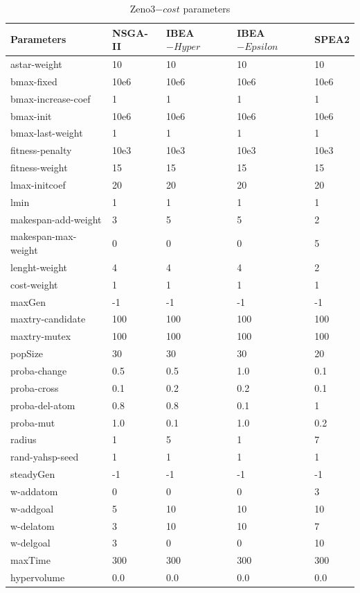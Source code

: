 \documentclass[a4paper,10pt]{article}
\begin{document}
\begin{table}[h]
\scriptsize
\begin{tabular}{|l|l|l|l|l|}

\hline
Parameters & NSGA-II & IBEA$-{Hyper}$ &IBEA$-{Epsilon}$ &    SPEA2\\
\hline
astar-weight		&	10	&	10	&	10	&	10		\\
bmax-fixed		&	10e6	&	10e6	&	10e6	&	10e6		\\
bmax-increase-coef		&	1	&	1	&	1	&	1		\\
bmax-init		&	10e6	&	10e6	&	10e6	&	10e6		\\
bmax-last-weight		&	1	&	1	&	1	&	1		\\
fitness-penalty		&	10e3	&	10e3	&	10e3	&	10e3		\\
fitness-weight		&	15	&	15	&	15	&	15		\\
lmax-initcoef		&	20	&	20	&	20	&	20		\\
lmin		&	1	&	1	&	1	&	1		\\
makespan-add-weight		&	3	&	5	&	5	&	2		\\
makespan-max-weight		&	0	&	0	&	0	&	5		\\
lenght-weight		&	4	&	4	&	4	&	2		\\
cost-weight		&	1	&	1	&	1	&	1		\\
maxGen		&	-1	&	-1	&	-1	&	-1		\\
maxtry-candidate		&	100	&	100	&	100	&	100		\\
maxtry-mutex		&	100	&	100	&	100	&	100		\\
popSize		&	30	&	30	&	30	&	20		\\
proba-change		&	0.5	&	0.5	&	1.0	&	0.1		\\
proba-cross		&	0.1	&	0.2	&	0.2	&	0.1		\\
proba-del-atom		&	0.8	&	0.8	&	0.1	&	1		\\
proba-mut		&	1.0	&	0.1	&	1.0	&	0.2		\\
radius		&	1	&	5	&	1	&	7		\\
rand-yahsp-seed		&	1	&	1	&	1	&	1		\\
steadyGen		&	-1	&	-1	&	-1	&	-1		\\
w-addatom		&	0	&	0	&	0	&	3		\\
w-addgoal		&	5	&	10	&	10	&	10		\\
w-delatom		&	3	&	10	&	10	&	7		\\
w-delgoal		&	3	&	0	&	0	&	10		\\
maxTime		&	300	&	300	&	300	&	300		\\
\hline
hypervolume		&	 0.0	&	 0.0	&	 0.0	&	 0.0		\\
\hline

\end{tabular}

\caption{Zeno3$-{cost}$ parameters}
\label{tab:zeno3_costParam}
\end{table}
\end{document}
